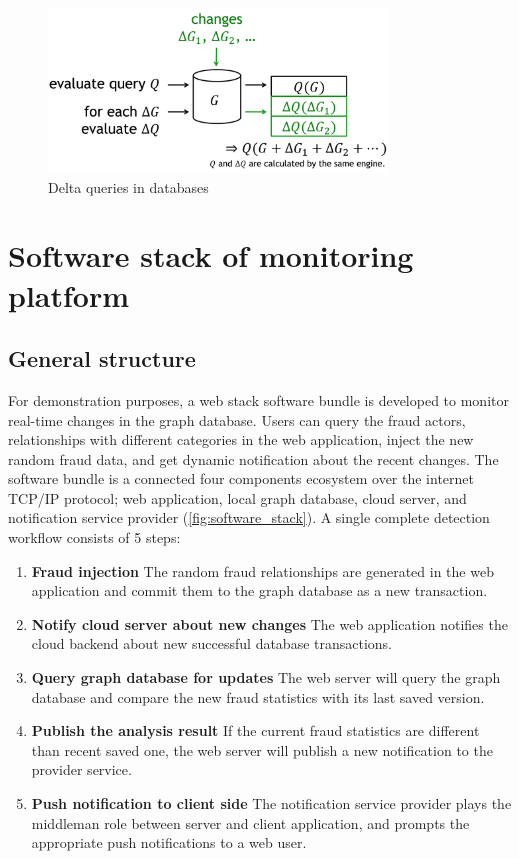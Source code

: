 \begin{figure}[!ht]
  \centering
  \includegraphics[width=0.8\textwidth]{figures/incremental_view_maintenance.png}
  \caption{Delta queries in databases~\cite{talks/OCIM4/ivm}} 
  \label{fig:incremental_vm}
\end{figure}

\section{Software stack of monitoring platform}

\subsection{General structure}

For demonstration purposes, a web stack software bundle is developed to monitor real-time changes in the graph database.
Users can query the fraud actors, relationships with different categories in the web application, inject the new random fraud data, and get dynamic notification about the recent changes.
The software bundle is a connected four components ecosystem over the internet TCP/IP protocol; web application, local graph database, cloud server, and notification service provider (\autoref{fig:software_stack}).
A single complete detection workflow consists of 5 steps:

\begin{enumerate}
  \item \textbf{Fraud injection} The random fraud relationships are generated in the web application and commit them to the graph database as a new transaction. 
  \item \textbf{Notify cloud server about new changes} The web application notifies the cloud backend about new successful database transactions.
  \item \textbf{Query graph database for updates} The web server will query the graph database and compare the new fraud statistics with its last saved version.
  \item \textbf{Publish the analysis result} If the current fraud statistics are different than recent saved one, the web server will publish a new notification to the provider service.
  \item \textbf{Push notification to client side} The notification service provider plays the middleman role between server and client application, and prompts the appropriate push notifications to a web user. 
\end{enumerate}

